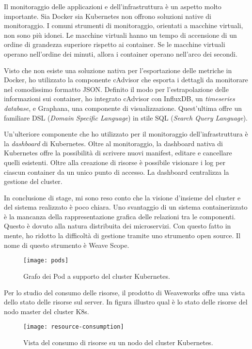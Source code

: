 Il monitoraggio delle applicazioni e dell'infrastruttura 
è un aspetto molto importante. Sia Docker sia Kubernetes 
non offrono soluzioni native di monitoraggio. I comuni 
strumenti di monitoraggio, orientati a macchine virtuali, 
non sono più idonei. Le macchine virtuali hanno un tempo di
accensione di un ordine di grandezza superiore rispetto 
ai container. Se le macchine virtuali operano nell'ordine 
dei minuti, allora i container operano nell'arco dei secondi. 

Visto che non esiste una soluzione nativa per l'esportazione delle
metriche in Docker, ho utilizzato la componente cAdvisor che
esporta i dettagli da monitorare nel comodissimo formatto JSON. 
Definito il modo per l'estrapolazione delle informazioni 
sui container, ho integrato cAdvisor con InfluxDB, un \textit{timeseries database}, 
e Graphana, una componente di visualizzazione. Quest'ultima offre 
un familiare DSL (\textit{Domain Specific Language}) 
in stile SQL (\textit{Search Query Language}).  

Un'ulteriore componente che ho utilizzato per il monitoraggio 
dell'infrastruttura è la \textit{dashboard} di Kubernetes.
Oltre al monitoraggio, la dashboard nativa di Kubernetes
offre la possibilità di scrivere nuovi manifest, editare 
e cancellare quelli esistenti. Oltre alla creazione di risorse
è possibile visionare i log per ciascun container da un unico 
punto di accesso. La dashboard centralizza la gestione del cluster. 

In conclusione di stage, mi sono reso conto che la visione 
d'insieme del cluster e del sistema realizzato è poco chiara. 
Uno svantaggio di un sistema containerizzato è la mancanza 
della rappresentazione grafica delle relazioni tra le componenti.
Questo è dovuto alla natura distribuita dei microservizi. 
Con questo fatto in mente, ho ridotto la difficoltà di gestione
tramite uno strumento open source. Il nome di questo strumento 
è Weave Scope. 

\begin{figure}[htbp]
	\begin{center}
		\texttt{[image: pods]}
		\caption{Grafo dei Pod a supporto del cluster Kubernetes.}
	\end{center}
\end{figure} 
\newpage
Per lo studio del consumo delle risorse, il prodotto di Weaveworks
offre una vista dello stato delle risorse sul server. In figura 
illustro qual è lo stato delle risorse del nodo master del cluster K8s.
\begin{figure}[htbp]
	\begin{center}
		\texttt{[image: resource-consumption]}
		\caption{Vista del consumo di risorse su un nodo del cluster Kubernetes.}
	\end{center}
\end{figure}

